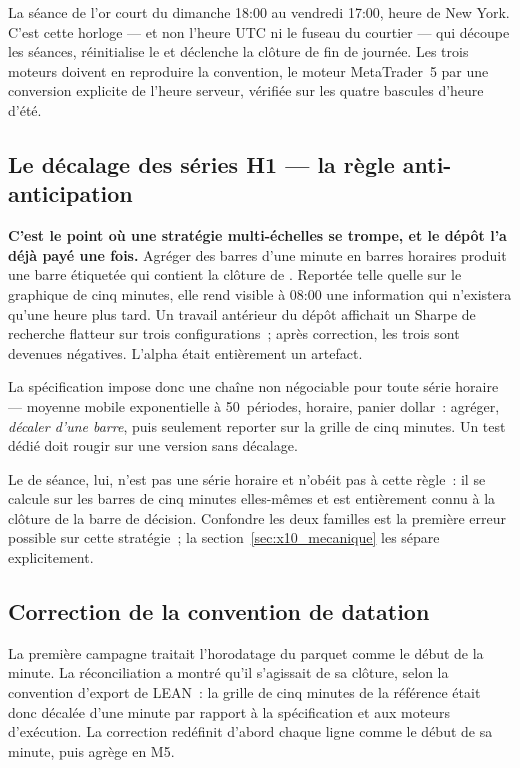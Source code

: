 La séance de l'or court du dimanche 18:00 au vendredi 17:00, heure de New
York. C'est cette horloge --- et non l'heure UTC ni le fuseau du courtier ---
qui découpe les séances, réinitialise le  et déclenche la clôture
de fin de journée. Les trois moteurs doivent en reproduire la convention, le
moteur MetaTrader~5 par une conversion explicite de l'heure serveur, vérifiée
sur les quatre bascules d'heure d'été.

\subsection{Le décalage des séries H1 --- la règle anti-anticipation}

\begin{warningbox}
\textbf{C'est le point où une stratégie multi-échelles se trompe, et le dépôt
l'a déjà payé une fois.} Agréger des barres d'une minute en barres horaires
produit une barre étiquetée  qui contient la clôture de
. Reportée telle quelle sur le graphique de cinq minutes, elle
rend visible à 08:00 une information qui n'existera qu'une heure plus tard. Un
travail antérieur du dépôt affichait un Sharpe de recherche flatteur sur trois
configurations~; après correction, les trois sont devenues négatives. L'alpha
était entièrement un artefact.
\end{warningbox}

La spécification impose donc une chaîne non négociable pour toute série
horaire --- moyenne mobile exponentielle à 50~périodes,  horaire,
panier dollar~: agréger, \emph{décaler d'une barre}, puis seulement reporter
sur la grille de cinq minutes. Un test dédié doit rougir sur une version sans
décalage.

Le  de séance, lui, n'est pas une série horaire et n'obéit pas à
cette règle~: il se calcule sur les barres de cinq minutes elles-mêmes et est
entièrement connu à la clôture de la barre de décision. Confondre les deux
familles est la première erreur possible sur cette stratégie~; la
section~\ref{sec:x10_mecanique} les sépare explicitement.

\subsection{Correction de la convention de datation}

La première campagne traitait l'horodatage du parquet comme le début de la
minute. La réconciliation a montré qu'il s'agissait de sa clôture, selon la
convention d'export de LEAN~: la grille de cinq minutes de la référence était
donc décalée d'une minute par rapport à la spécification et aux moteurs
d'exécution. La correction redéfinit d'abord chaque ligne comme le début de sa
minute, puis agrège en M5.

